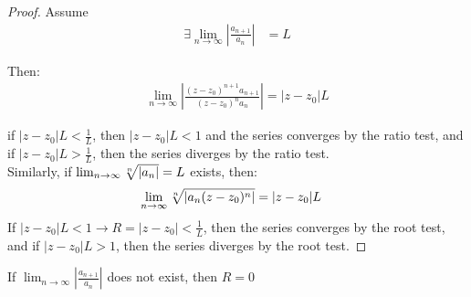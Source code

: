 \begin{proof}
    Assume
    \begin{align*}
        \exists \lim_{n \to \infty}\left| \frac{a_{n+1}}{a_n} \right| & = L
    \end{align*}

    Then:
    \begin{align*}
        \lim_{n \to \infty}\left| \frac{(z-z_0)^{n+1}a_{n+1}}{(z-z_0)^n a_n} \right| = |z - z_0 | L
    \end{align*}

    if $|z - z_0|L< \frac{1}{L}$, then $|z - z_0| L < 1$ and the series converges by the ratio test, and if $|z - z_0|L > \frac{1}{L}$, then the series diverges by the ratio test.\\

    Similarly, if $\lim_{n \to \infty} \root{n}\of{|a_n|} = L$ exists, then:
    \begin{align*}
        \lim_{n \to \infty} \root{n}\of{|a_n (z - z_0)^n|} & = |z - z_0| L
    \end{align*}
    If $|z - z_0|L < 1 \to R = |z - z_0| < \frac{1}L$, then the series converges by the root test, and if $|z - z_0|L > 1$, then the series diverges by the root test.
\end{proof}

\begin{remark}
    If $\lim_{n \to \infty}\left| \frac{a_{n+1}}{a_n} \right|$ does not exist, then $R = 0$
\end{remark}